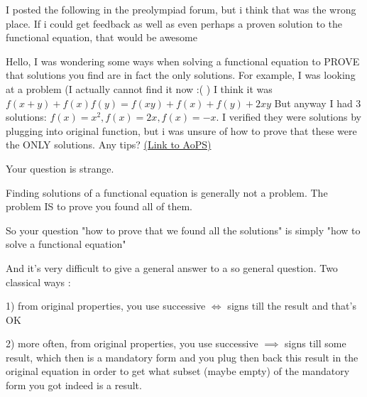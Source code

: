 \begin{problem}
	I posted the following in the preolympiad forum, but i think that was the wrong place. If i could get feedback as well as even perhaps a proven solution to the functional equation, that would be awesome

Hello, I was wondering some ways when solving a functional equation to PROVE that solutions you find are in fact the only solutions. For example, I was looking at a problem (I actually cannot find it now :( ) 
I think it was
$f(x+y)+f(x)f(y)=f(xy)+f(x)+f(y)+2xy$
But anyway I had 3 solutions: $f(x)=x^2, f(x)=2x, f(x)=-x$. I verified they were solutions by plugging into original function, but i was unsure of how to prove that these were the ONLY solutions. Any tips?
	\flushright \href{https://artofproblemsolving.com/community/c6h474274}{(Link to AoPS)}
\end{problem}



\begin{solution}
	Your question is strange.

Finding solutions of a functional equation is generally not a problem.
The problem IS to prove you found all of them.

So your question "how to prove that we found all the solutions" is simply "how to solve a functional equation"

And it's very difficult to give a general answer to a so general question.
Two classical ways :

1) from original properties, you use successive $\iff$ signs till the result and that's OK

2) more often, from original properties, you use successive $\implies$ signs till some result, which then is a mandatory form and you plug then back this result in the original equation in order to get what subset (maybe empty) of the mandatory form you got indeed is a result.
\end{solution}



